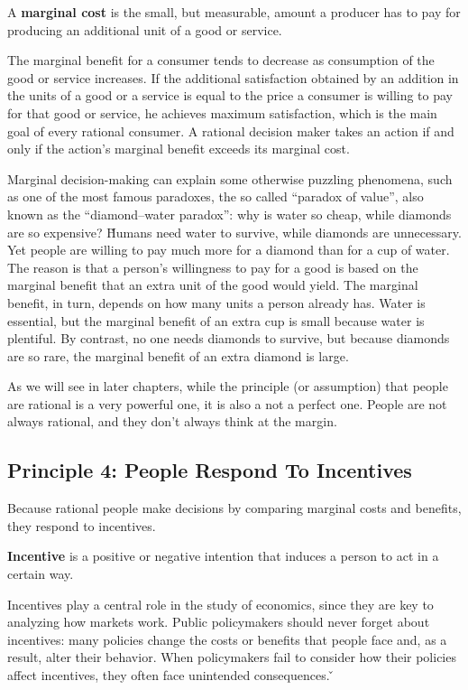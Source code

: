A \textbf{marginal cost} is the small, but measurable, amount a producer has to pay for producing an additional unit of
a good or service.
\ed

The marginal benefit for a consumer tends to decrease as consumption of the good or service increases. If the additional
satisfaction obtained by an addition in the units of a good or a service is equal to the price a consumer is willing
to pay for that good or service, he achieves maximum satisfaction, which is the main goal of every rational consumer. A
rational decision maker takes an action if and only if the action's marginal benefit exceeds its marginal cost.

\be
Marginal decision-making can explain some otherwise puzzling phenomena, such as one of the most famous paradoxes, the
so called ``paradox of value'', also known as the ``diamond–water paradox'': why is water so cheap, while diamonds
are so expensive? \v

Humans need water to survive, while diamonds are unnecessary. Yet people are willing to pay much more for a diamond
than for a cup of water. The reason is that a person's willingness to pay for a good is based on the marginal benefit
that an extra unit of the good would yield. The marginal benefit, in turn, depends on how many units a person already
has. Water is essential, but the marginal benefit of an extra cup is small because water is plentiful. By contrast,
no one needs diamonds to survive, but because diamonds are so rare, the marginal benefit of an extra diamond is large.
\ee

As we will see in later chapters, while the principle (or assumption) that people are rational is a very powerful one,
it is also a not a perfect one. People are not always rational, and they don't always think at the margin.

\subsection*{Principle 4: People Respond To Incentives}

Because rational people make decisions by comparing marginal costs and benefits, they respond to incentives.

\bd[Incentive]
\textbf{Incentive} is a positive or negative intention that induces a person to act in a certain way.
\ed

Incentives play a central role in the study of economics, since they are key to analyzing how markets work. Public
policymakers should never forget about incentives: many policies change the costs or benefits that people face and,
as a result, alter their behavior. When policymakers fail to consider how their policies affect incentives, they often
face unintended consequences. \v

